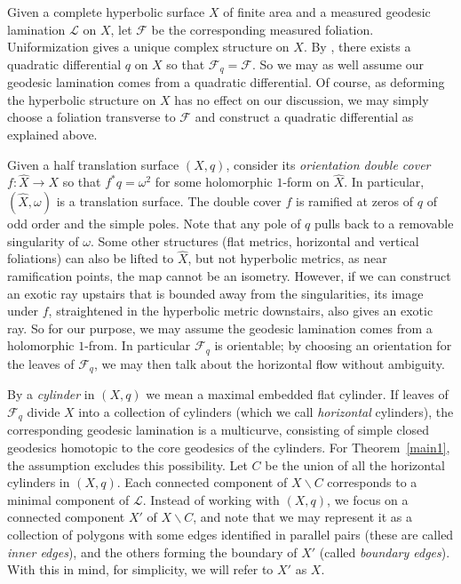 \documentclass[11pt]{article} %
\theoremstyle{plain}
\theoremstyle{definition}
\numberwithin{equation}{section}
\begin{document}
Given a complete hyperbolic surface $X$ of finite area and a measured geodesic lamination $\mathcal{L}$ on $X$, let $\mathcal{F}$ be the corresponding measured foliation. Uniformization gives a unique complex structure on $X$. By \cite[Main Theorem]{qd&foliations}, there exists a quadratic differential $q$ on $X$ so that $\mathcal{F}_q=\mathcal{F}$. So we may as well assume our geodesic lamination comes from a quadratic differential. Of course, as deforming the hyperbolic structure on $X$ has no effect on our discussion, we may simply choose a foliation transverse to $\mathcal{F}$ and construct a quadratic differential as explained above.

Given a half translation surface $(X,q)$, consider its \emph{orientation double cover} $f:\hat X\to X$ so that $f^*q=\omega^2$ for some holomorphic $1$-form on $\hat X$. In particular, $(\hat X,\omega)$ is a translation surface. The double cover $f$ is ramified at zeros of $q$ of odd order and the simple poles. Note that any pole of $q$ pulls back to a removable singularity of $\omega$. Some other structures (flat metrics, horizontal and vertical foliations) can also be lifted to $\hat X$, but not hyperbolic metrics, as near ramification points, the map cannot be an isometry. However, if we can construct an exotic ray upstairs that is bounded away from the singularities, its image under $f$, straightened in the hyperbolic metric downstairs, also gives an exotic ray. So for our purpose, we may assume the geodesic lamination comes from a holomorphic $1$-from. In particular $\mathcal{F}_q$ is orientable; by choosing an orientation for the leaves of $\mathcal{F}_q$, we may then talk about the horizontal flow without ambiguity.

By a \emph{cylinder} in $(X,q)$ we mean a maximal embedded flat cylinder. If leaves of $\mathcal{F}_q$ divide $X$ into a collection of cylinders (which we call \emph{horizontal} cylinders), the corresponding geodesic lamination is a multicurve, consisting of simple closed geodesics homotopic to the core geodesics of the cylinders. For Theorem~\ref{main1}, the assumption excludes this possibility. Let $C$ be the union of all the horizontal cylinders in $(X,q)$. Each connected component of $X\backslash C$ corresponds to a minimal component of $\mathcal{L}$. Instead of working with $(X,q)$, we focus on a connected component $X'$ of $X\backslash C$, and note that we may represent it as a collection of polygons with some edges identified in parallel pairs (these are called \emph{inner edges}), and the others forming the boundary of $X'$ (called \emph{boundary edges}). With this in mind, for simplicity, we will refer to $X'$ as $X$.
\end{document}
